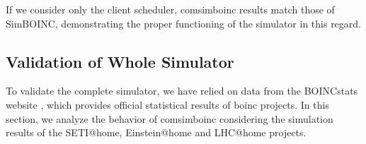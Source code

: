 \begin{itemize}
\begin{table}[htbp]
\centering
{}
\caption{Executed tasks (single project running on a single host of 5.5 Giga\acrshort{flops}).}
\label{tab:validation3}
\end{table}

\end{itemize}

If we consider only the client scheduler, \gls{comsimboinc} results match those of SimBOINC, demonstrating the proper functioning of the simulator in this regard.

\subsection{Validation of Whole Simulator}
\label{subsec:validation_of_the_whole_simulator}

To validate the complete simulator, we have relied on data from the BOINCstats website \cite{BOINC2016}, which provides official statistical results of \gls{boinc} projects. In this section, we analyze the behavior of \gls{comsimboinc} considering the simulation results of the SETI@home, Einstein@home and LHC@home projects.

